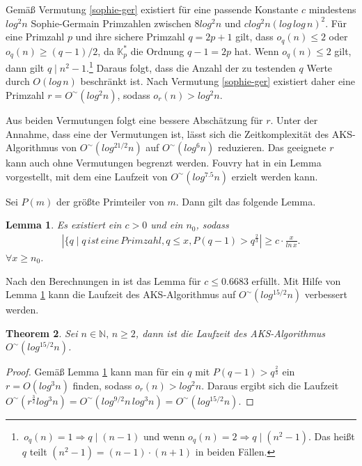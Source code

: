 \documentclass[12pt,oneside]{article}
\newtheorem{theorem}{Theorem}[section]
\newtheorem{lemma}[theorem]{Lemma}
\theoremstyle{remark}
\theoremstyle{definition}
\begin{document}
Gemäß Vermutung \ref{sophie-ger} existiert für eine passende Konstante $c$ mindestens $log^2n$ Sophie-Germain Primzahlen zwischen $8 log^2 n$ und $c log^2n(log \, log \, n)^2$. Für eine Primzahl $p$ und ihre sichere Primzahl $q = 2p + 1$ gilt, dass $o_{q}(n) \leq  2$ oder $o_{q}(n) \geq (q - 1)/2$, da $\mathbb{K}_{p}^{*}$ die Ordnung $q - 1 = 2p$ hat. Wenn $o_{q}(n) \leq 2$ gilt, dann gilt $q \mid n^2 - 1$.\footnote{$ \, o_{q}(n) = 1 \Rightarrow q \mid (n - 1)$ und wenn $o_{q}(n) = 2 \Rightarrow q \mid (n^2 - 1)$. Das heißt $q$ teilt $(n^2 - 1) = (n - 1) \cdot (n + 1)$ in beiden Fällen.} Daraus folgt, dass die Anzahl der zu testenden $q$ Werte durch $O(log \, n)$ beschränkt ist. Nach Vermutung \ref{sophie-ger} existiert daher eine Primzahl $r = O^{\sim}(log^2 n)$, sodass $o_{r}(n) > log^2n$. 

Aus beiden Vermutungen folgt eine bessere Abschätzung für $r$. Unter der Annahme, dass eine der Vermutungen ist, lässt sich die Zeitkomplexität des AKS-Algorithmus von $O^{\sim}(log^{21/2}n)$ auf $O^{\sim}(log^6n)$ reduzieren. Das geeignete $r$ kann auch ohne Vermutungen begrenzt werden. Fouvry hat in \cite{fouvry} ein Lemma vorgestellt, mit dem eine Laufzeit von $O^{\sim}(log^{7.5}n)$ erzielt werden kann. 

Sei $P(m)$ der größte Primteiler von $m$. Dann gilt das folgende Lemma. 
\begin{lemma}\label{fovury-lemma}
Es existiert ein $c > 0$ und ein $n_0$, sodass
\begin{align*}
     |\{ q \mid q \, ist \,  eine \, Primzahl, q \leq x, P(q - 1) > q^{\frac{2}{3}}| \geq c \cdot \frac{x}{ln \, x}.
\end{align*}
$\forall x \geq n_0$.
\end{lemma}

Nach den Berechnungen in \cite{baker-hartman} ist das Lemma für $c \leq 0.6683$ erfüllt. Mit Hilfe von Lemma \ref{fovury-lemma} kann die Laufzeit des AKS-Algorithmus auf $O^{\sim}(log^{15/2}n)$ verbessert werden.

\begin{theorem}
Sei $n \in \mathbb{N}, \, n \geq 2$, dann ist die Laufzeit des AKS-Algorithmus $O^{\sim}(log^{15/2}n)$.
\end{theorem}

\begin{proof}
Gemäß Lemma \ref{fovury-lemma} kann man für ein $q$ mit $P(q - 1) > q^{ \frac{2}{3}}$ ein $r = O(log^3 n)$ finden, sodass $o_{r}(n) > log^2 n$. Daraus ergibt sich die Laufzeit $O^{\sim}(r^{\frac{3}{2}} log^3 n) = O^{\sim}(log^{9/2}n \, log^3 n) = O^{\sim}(log^{15/2} n)$.
\end{proof}
\end{document}
